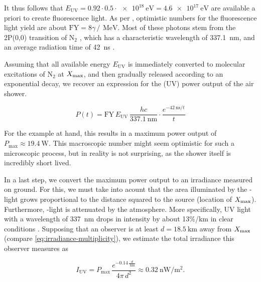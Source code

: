 It thus follows that $E_\text{UV}=0.92\cdot0.5\cdot\SI{e18}{\electronvolt}=
\SI{4.6e17}{\electronvolt}$ are available a priori to create fluorescence light.
As per \cite{Keilhauer2013}, optimistic numbers for the fluorescence light yield
are about $\text{FY}=8\gamma\,/\,\SI{}{\mega\electronvolt}$. Most of these 
photons stem from the 2P(0,0) transition of N$_2$ \cite{Ave2008}, which has a 
characteristic wavelength of \SI{337.1}{\nano\meter}, and an average radiation 
time of \SI{42}{\nano\second} \cite{Lean1989}. 

Assuming that all available energy $E_\text{UV}$ is immediately converted to 
molecular excitations of N$_2$ at $X_\mathrm{max}$, and then gradually released according
to an exponential decay, we recover an expression for the (UV) power output of 
the air shower.

\begin{equation}
\label{eq:irradiance-power}
P(t)= \text{FY}\,E_\text{UV}\,\frac{hc}{\SI{337.1}{\nano\meter}} \cdot\frac{e^{-\SI{42}{\nano\second}/t}}{t}   
\end{equation}

For the example at hand, this results in a maximum power output of 
$P_\text{max}\approx\SI{19.4}{\watt}$. This macroscopic number might seem
optimistic for such a microscopic process, but in reality is not surprising, as 
the shower itself is incredibly short lived. 

In a last step, we convert the maximum power output to an irradiance measured on
ground. For this, we must take into acount that the area illuminated by the 
\UV-light grows proportional to the distance squared to the source (location of 
$X_\mathrm{max}$). Furthermore, \UV-light is attenuated by the atmosphere. More 
specifically, UV light with a wavelength of \SI{337}{\nano\meter} drops in 
intensity by about 13\%/km in clear conditions 
\cite[see Fig. 83 on page 103 of][]{Baum1950}. Supposing that an observer is at
least $d=\SI{18.5}{\kilo\meter}$ away from $X_\mathrm{max}$ (compare 
\cref{eq:irradiance-multiplicity}), we estimate the total irradiance this 
observer measures as

\begin{equation}
\label{eq:irradiance}
I_\text{UV} = P_\text{max}\,\frac{e^{-0.14\,\frac{d}{\SI{}{\kilo\meter}}}}{4\pi\,d^2}\approx\SI{0.32}{\nano\watt\per\square\meter}.
\end{equation}
